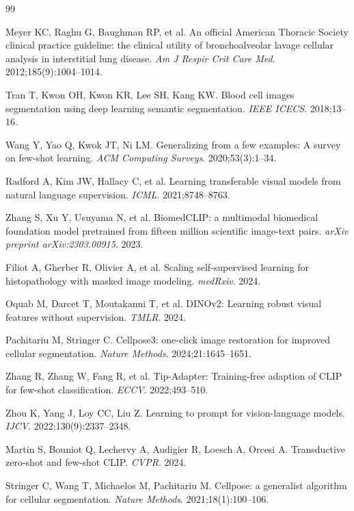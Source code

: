 \documentclass[preprint,review,12pt]{elsarticle}
\begin{document}
\begin{thebibliography}{99}

Meyer KC, Raghu G, Baughman RP, et al.
An official American Thoracic Society clinical practice guideline: the clinical utility of bronchoalveolar lavage cellular analysis in interstitial lung disease.
\textit{Am J Respir Crit Care Med}. 2012;185(9):1004--1014.

Tran T, Kwon OH, Kwon KR, Lee SH, Kang KW.
Blood cell images segmentation using deep learning semantic segmentation.
\textit{IEEE ICECS}. 2018;13--16.

Wang Y, Yao Q, Kwok JT, Ni LM.
Generalizing from a few examples: A survey on few-shot learning.
\textit{ACM Computing Surveys}. 2020;53(3):1--34.

Radford A, Kim JW, Hallacy C, et al.
Learning transferable visual models from natural language supervision.
\textit{ICML}. 2021;8748--8763.

Zhang S, Xu Y, Usuyama N, et al.
BiomedCLIP: a multimodal biomedical foundation model pretrained from fifteen million scientific image-text pairs.
\textit{arXiv preprint arXiv:2303.00915}. 2023.

Filiot A, Gherber R, Olivier A, et al.
Scaling self-supervised learning for histopathology with masked image modeling.
\textit{medRxiv}. 2024.

Oquab M, Darcet T, Moutakanni T, et al.
DINOv2: Learning robust visual features without supervision.
\textit{TMLR}. 2024.

Pachitariu M, Stringer C.
Cellpose3: one-click image restoration for improved cellular segmentation.
\textit{Nature Methods}. 2024;21:1645--1651.

Zhang R, Zhang W, Fang R, et al.
Tip-Adapter: Training-free adaption of CLIP for few-shot classification.
\textit{ECCV}. 2022;493--510.

Zhou K, Yang J, Loy CC, Liu Z.
Learning to prompt for vision-language models.
\textit{IJCV}. 2022;130(9):2337--2348.

Martin S, Bouniot Q, Lechervy A, Audigier R, Loesch A, Orcesi A.
Transductive zero-shot and few-shot CLIP.
\textit{CVPR}. 2024.

Stringer C, Wang T, Michaelos M, Pachitariu M.
Cellpose: a generalist algorithm for cellular segmentation.
\textit{Nature Methods}. 2021;18(1):100--106.


\end{thebibliography}
\end{document}
